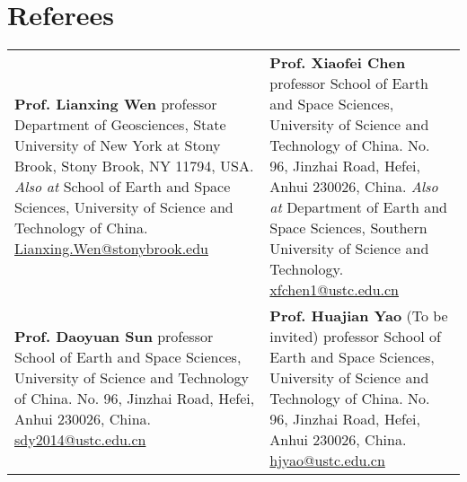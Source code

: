 \section*{Referees}
\renewcommand{\arraystretch}{2.0}

\begin{tabular}{p{} p{}}
\textbf{Prof. Lianxing Wen} \newline
professor \newline
Department of Geosciences, \newline
State University of New York at Stony Brook, \newline
Stony Brook, NY 11794, USA. \newline
\textit{Also at} School of Earth and Space Sciences, \newline
University of Science and Technology of China. \newline
\href{mailto:Lianxing.Wen@stonybrook.edu}{Lianxing.Wen@stonybrook.edu}
&
\textbf{Prof. Xiaofei Chen} \newline
professor \newline
School of Earth and Space Sciences, \newline
University of Science and Technology of China. \newline
No. 96, Jinzhai Road, Hefei, Anhui 230026, China. \newline
\textit{Also at} Department of Earth and Space Sciences, \newline
Southern University of Science and Technology. \newline
\href{mailto:xfchen1@ustc.edu.cn}{xfchen1@ustc.edu.cn}
\\
\textbf{Prof. Daoyuan Sun} \newline
professor \newline
School of Earth and Space Sciences, \newline
University of Science and Technology of China. \newline
No. 96, Jinzhai Road, Hefei, Anhui 230026, China. \newline
\href{mailto:sdy2014@ustc.edu.cn}{sdy2014@ustc.edu.cn}
&
\textbf{Prof. Huajian Yao} (To be invited)\newline
professor \newline
School of Earth and Space Sciences, \newline
University of Science and Technology of China. \newline
No. 96, Jinzhai Road, Hefei, Anhui 230026, China. \newline
\href{mailto:hjyao@ustc.edu.cn}{hjyao@ustc.edu.cn}
\\
\end{tabular}
